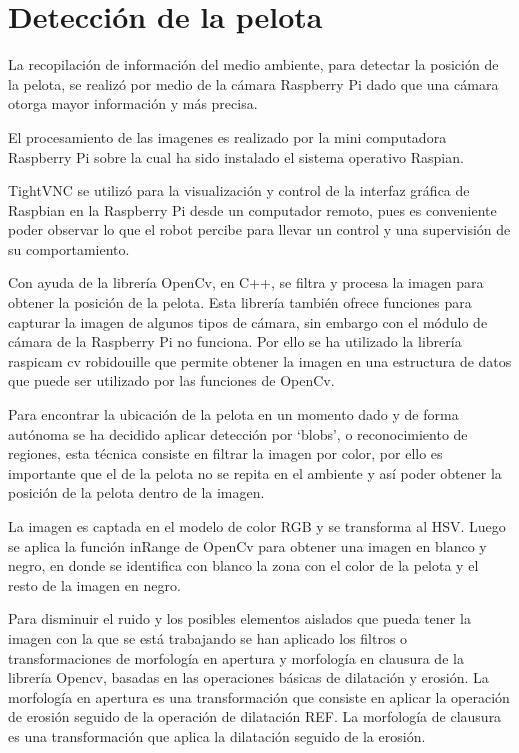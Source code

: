 \section{Detección de la pelota}\label{chapter:deteccion}


La recopilación de información del medio ambiente, para detectar la posición de la pelota, se realiz\'o por medio de la cámara Raspberry Pi dado que una cámara otorga mayor información y más precisa. 

El procesamiento de las imagenes es realizado por la mini computadora Raspberry Pi sobre la cual ha sido instalado el sistema operativo Raspian.

TightVNC se utilizó para la visualización y control de la interfaz gráfica de Raspbian en la Raspberry Pi desde un computador remoto, pues es conveniente poder observar lo que el robot percibe para llevar un control y una supervisión de su comportamiento.

Con ayuda de la librería OpenCv, en C++, se filtra y procesa la imagen para obtener la posición de la pelota. Esta librería también ofrece funciones para capturar la imagen de algunos tipos de cámara, sin embargo con el módulo de cámara de la Raspberry Pi no funciona. Por ello se ha utilizado la librería raspicam cv robidouille que permite obtener la imagen en una estructura de datos que puede ser utilizado por las funciones de OpenCv. 

Para encontrar la ubicación de la pelota en un momento dado y de forma autónoma se ha decidido aplicar detección por ‘blobs’, o reconocimiento de regiones, esta técnica consiste en filtrar la imagen por color, por ello es importante que el de la pelota no se repita en el ambiente y así poder obtener la posición de la pelota dentro de la imagen.

La imagen es captada en el modelo de color RGB y se transforma al HSV. Luego se aplica la función inRange de OpenCv para obtener una imagen en blanco y negro, en donde se identifica con blanco la zona con el color de la pelota y el resto de la imagen en negro. 

Para disminuir el ruido y los posibles elementos aislados que pueda tener la imagen con la que se está trabajando se han aplicado los filtros o transformaciones de morfología en apertura y morfología en clausura de la librería Opencv, basadas en las operaciones básicas de dilatación y erosión. La morfología en apertura es una transformación que consiste en aplicar la operación de erosión seguido de la operación de dilatación REF. La morfología de clausura es una transformación que aplica la dilatación seguido de la erosión.

